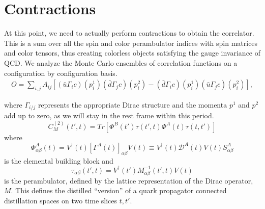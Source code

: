 \section{Contractions}
At this point, we need to actually perform contractions to obtain the correlator. This is a sum over all the spin and color perambulator indices with spin matrices and color tensors, thus creating colorless objects satisfying the gauge invariance of QCD. We analyze the Monte Carlo ensembles of correlation functions on a configuration by configuration basis. 
\begin{align}
    \label{ops_cc}
    O=\sum_{i,j} A_{ij}  [(\bar u\Gamma_i c)( p^1_{i})(\bar d\Gamma_{j} c)(p^2_{i}) -  (\bar d \Gamma_i c)({ p^1_{i}})(\bar u\Gamma_{j} c)({ p^2_{i}}) ]\nonumber,
    \end{align}

    where $\Gamma_{i/j}$ represents the appropriate Dirac structure and the momenta $p^1$ and $p^2$ add up to zero, as we will stay in the rest frame within this period. 
$$C_M^{(2)}(t',t) = Tr[\Phi^B(t')\tau(t',t)\Phi^A(t)\tau(t,t')]$$ 
where 
$$\Phi^A_{\alpha\beta}(t) = V^{\dagger}(t) [\Gamma^A(t)]_{\alpha\beta} V(t) \equiv V^{\dagger}(t)\mathcal{D}^A(t)V(t)S^A_{\alpha\beta}$$ is the elemental building block  
and 
$$\tau_{\alpha\beta}(t',t) = V^{\dagger}(t')M_{\alpha\beta}^{-1}(t',t)V(t)$$ 
is the perambulator, defined by the lattice representation of the Dirac operator, $M$. This defines the distilled ``version'' of a quark propagator connected distillation spaces on two time slices $t,t'$.  

